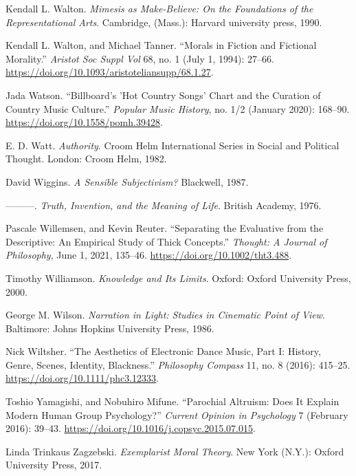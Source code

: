\documentclass[phdthesis,12pt,final,a4paper]{wuthesis}
\newlength{\cslhangindent}
\newenvironment{CSLReferences}[2] %
{\begin{list}{}{%
	\setlength{\itemindent}{0pt}
	\setlength{\leftmargin}{0pt}
	\setlength{\parsep}{0pt}
	\ifodd #1
	\setlength{\leftmargin}{\cslhangindent}
	\setlength{\itemindent}{-1\cslhangindent}
	\fi
	\setlength{\itemsep}{#2\baselineskip}}}
{\end{list}}
\theoremstyle{definition}
\theoremstyle{definition}
\theoremstyle{definition}
\theoremstyle{definition}
\theoremstyle{remark}
\begin{document}
\begin{CSLReferences}{1}{0}
Kendall L. Walton. \emph{Mimesis as {Make-Believe}: {On} the {Foundations} of the {Representational Arts}}. Cambridge, (Mass.): Harvard university press, 1990.

Kendall L. Walton, and Michael Tanner. {``Morals in {Fiction} and {Fictional Morality}.''} \emph{Aristot Soc Suppl Vol} 68, no. 1 (July 1, 1994): 27--66. \url{https://doi.org/10.1093/aristoteliansupp/68.1.27}.

Jada Watson. {``Billboard's '{Hot Country Songs}' Chart and the Curation of Country Music Culture.''} \emph{Popular Music History}, no. 1/2 (January 2020): 168--90. \url{https://doi.org/10.1558/pomh.39428}.

E. D. Watt. \emph{Authority}. Croom {Helm} International Series in Social and Political Thought. London: Croom Helm, 1982.

David Wiggins. \emph{A {Sensible Subjectivism}?} Blackwell, 1987.

---------. \emph{Truth, {Invention}, and the {Meaning} of {Life}}. British Academy, 1976.

Pascale Willemsen, and Kevin Reuter. {``Separating the Evaluative from the Descriptive: {An} Empirical Study of Thick Concepts.''} \emph{Thought: A Journal of Philosophy}, June 1, 2021, 135--46. \url{https://doi.org/10.1002/tht3.488}.

Timothy Williamson. \emph{Knowledge and {Its Limits}}. Oxford: Oxford University Press, 2000.

George M. Wilson. \emph{Narration in Light: Studies in Cinematic Point of View}. Baltimore: Johns Hopkins University Press, 1986.

Nick Wiltsher. {``The {Aesthetics} of {Electronic Dance Music}, {Part I}: {History}, {Genre}, {Scenes}, {Identity}, {Blackness}.''} \emph{Philosophy Compass} 11, no. 8 (2016): 415--25. \url{https://doi.org/10.1111/phc3.12333}.

Toshio Yamagishi, and Nobuhiro Mifune. {``Parochial {Altruism}: {Does It Explain Modern Human Group Psychology}?''} \emph{Current Opinion in Psychology} 7 (February 2016): 39--43. \url{https://doi.org/10.1016/j.copsyc.2015.07.015}.

Linda Trinkaus Zagzebski. \emph{Exemplarist {Moral Theory}}. New York (N.Y.): Oxford University Press, 2017.

\end{CSLReferences}
\end{document}
